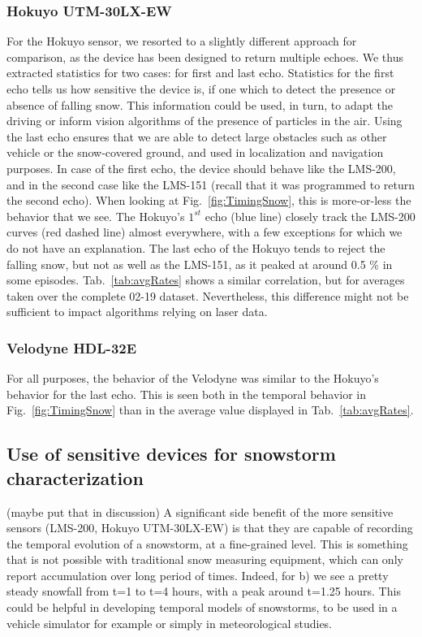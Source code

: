 \subsubsection{Hokuyo UTM-30LX-EW}
For the Hokuyo sensor, we resorted to a slightly different approach for comparison, as the device has been designed to return multiple echoes. We thus extracted statistics for two cases: for first and last echo. Statistics for the first echo tells us how sensitive the device is, if one which to detect the presence or absence of falling snow. This information could be used, in turn, to adapt the driving or inform vision algorithms of the presence of particles in the air. Using the last echo ensures that we are able to detect large obstacles such as other vehicle or the snow-covered ground, and used in localization and navigation purposes. In case of the first echo, the device should behave like the LMS-200, and in the second case like the LMS-151 (recall that it was programmed to return the second echo). When looking at Fig.~\ref{fig:TimingSnow}, this is more-or-less the behavior that we see. The Hokuyo's $1^{st}$ echo (blue line) closely track the LMS-200 curves (red dashed line) almost everywhere, with a few exceptions for which we do not have an explanation. The last echo of the Hokuyo tends to reject the falling snow, but not as well as the LMS-151, as it peaked at around 0.5 \% in some episodes. Tab.~\ref{tab:avgRates} shows a similar correlation, but for averages taken over the complete 02-19 dataset. Nevertheless, this difference might not be sufficient to impact algorithms relying on laser data.

\subsubsection{Velodyne HDL-32E}
For all purposes, the behavior of the Velodyne was similar to the Hokuyo's behavior for the last echo. This is seen both in the temporal behavior in Fig.~\ref{fig:TimingSnow} than in the average value displayed in Tab.~\ref{tab:avgRates}.

\subsection{Use of sensitive devices for snowstorm characterization}
(maybe put that in discussion)
A significant side benefit of the more sensitive sensors (LMS-200, Hokuyo UTM-30LX-EW) is that they are capable of recording the temporal evolution of a snowstorm, at a fine-grained level. This is something that is not possible with traditional snow measuring equipment, which can only report accumulation over long period of times. Indeed, for b) we see a pretty steady snowfall from t=1 to t=4 hours, with a peak around t=1.25 hours. This could be helpful in developing temporal models of snowstorms, to be used in a vehicle simulator for example or simply in meteorological studies.

